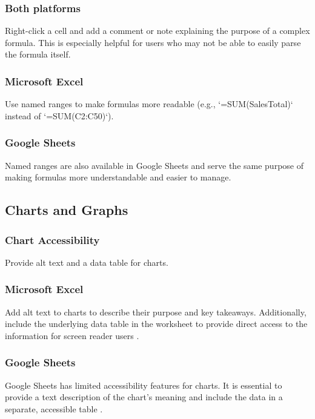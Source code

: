 \subsubsection{Both platforms}\label{ch15:sssec:formula-accessibility-both}
Right-click a cell and add a comment or note explaining the purpose of a complex formula. This is especially helpful for users who may not be able to easily parse the formula itself.

\subsubsection{Microsoft Excel}\label{ch15:sssec:excel-formulas}
Use named ranges to make formulas more readable (e.g., `=SUM(SalesTotal)` instead of `=SUM(C2:C50)`).

\subsubsection{Google Sheets}\label{ch15:sssec:sheets-formulas}
Named ranges are also available in Google Sheets and serve the same purpose of making formulas more understandable and easier to manage.

\subsection{Charts and Graphs}\label{ch15:ssec:charts-graphs}

\subsubsection{Chart Accessibility}\label{ch15:sssec:chart-accessibility}
Provide alt text and a data table for charts.

\subsubsection{Microsoft Excel}\label{ch15:sssec:excel-charts}
Add alt text to charts to describe their purpose and key takeaways. Additionally, include the underlying data table in the worksheet to provide direct access to the information for screen reader users \supercite{MicrosoftAccessibility}.

\subsubsection{Google Sheets}\label{ch15:sssec:sheets-charts}
Google Sheets has limited accessibility features for charts. It is essential to provide a text description of the chart's meaning and include the data in a separate, accessible table \supercite{GoogleAccessibility}.

